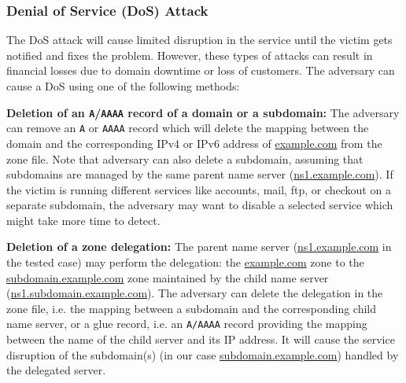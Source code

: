 \subsubsection{Denial of Service (DoS) Attack} 
The DoS attack will %
cause limited disruption in the service until the victim gets notified and fixes the problem. However, these types of attacks can result in financial losses due to domain downtime or loss of customers. The adversary can cause %
 a DoS using one of the following methods: %

\textbf{Deletion of an \texttt{A}/\texttt{AAAA} record of a domain or a subdomain:} The adversary can remove an \texttt{A} or \texttt{AAAA} record which will delete the mapping between the domain and the corresponding IPv4 or IPv6 address of \url{example.com} from the zone file. 
Note that adversary can also delete a subdomain, assuming that subdomains are managed by the same parent name server (\url{ns1.example.com}). 
If the victim is running different services like accounts, mail, ftp, or checkout on a separate subdomain, 
the adversary may want to disable a selected service which might take more time to detect.
\begin{comment}
it will %
disable a part of the website and might take more time to~detect. 
\end{comment}

 \textbf{Deletion of a zone delegation:} 
%
 The parent name server (\url{ns1.example.com} in the tested case) may perform the delegation: the \url{example.com} zone to the \url{subdomain.example.com} zone maintained by the child name server (\url{ns1.subdomain.example.com}).
 The adversary %
 can delete the delegation in the zone file, i.e. the mapping between a subdomain and the corresponding child name server, or a glue record, i.e. an \texttt{A/AAAA} record providing the mapping between the name of the child server and its IP address.
 It will cause the service disruption of the subdomain(s) (in our case \url{subdomain.example.com}) handled by the delegated server. %


